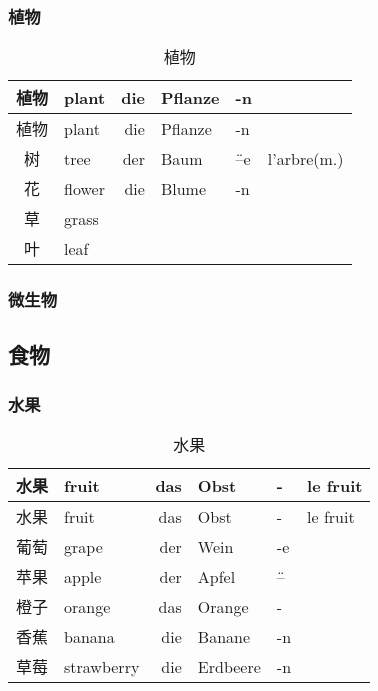 \documentclass[12pt,A4paper,oneside,reqno]{amsart}
\numberwithin{equation}{section}
\theoremstyle{plain}
\theoremstyle{plain}
\theoremstyle{plain}
\numberwithin{equation}{section}
\theoremstyle{remark}
\begin{document}
\subsubsection{植物}\hspace{1cm}
\begin{longtable}{c|l|rll|l}
	\hline
植物	&	plant	&	die	&	Pflanze	&	-n	&		\\
	\hline
	\endhead
	\hline
植物	&	plant	&	die	&	Pflanze	&	-n	&		\\
	\hline
	\endfirsthead	
	\hline
	\endfoot
	\hline	
	\caption{植物}
	\endlastfoot				

树	&	tree	&	der	&	Baum	&	\"{--}e	&	l'arbre(m.)	\\
花	&	flower	&	die	&	Blume	&	-n	&		\\
草	&	grass	&		&		&		&		\\
叶	&	leaf	&		&		&		&		\\

	
\end{longtable}
\subsubsection{微生物}\hspace{1cm}
\subsection{食物}\hspace{1cm} 
\subsubsection{水果}\hspace{1cm}
\begin{longtable}{c|l|rll|l}
	\hline
	水果	&	fruit	&das & Obst& - &	le fruit  	\\
	\hline
	\endhead
	\hline
	水果	&	fruit	&das & Obst& - &	le fruit  	\\
	\hline
	\endfirsthead	
	\hline
	\endfoot
	\hline	
	\caption{水果}
	\endlastfoot				
葡萄	&	grape	&	der	&	Wein	&	-e	&		\\
苹果	&	apple	&	der	&	Apfel	&	\"{--}	&		\\
橙子	&	orange	&	das	&	Orange	&	-	&		\\
香蕉	&	banana	&	die	&	Banane	&	-n	&		\\
草莓	&	strawberry	&	die	&	Erdbeere	&	-n	&		\\

	
	
\end{longtable}
\end{document}
